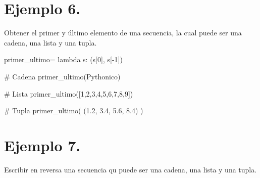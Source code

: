 \documentclass[
  letterpaper,
  DIV=11,
  numbers=noendperiod]{scrreprt}
\newenvironment{Shaded}{\begin{snugshade}}{\end{snugshade}}
\newcommand{\CommentTok}[1]{\textcolor[rgb]{0.37,0.37,0.37}{#1}}
\newcommand{\DecValTok}[1]{\textcolor[rgb]{0.68,0.00,0.00}{#1}}
\newcommand{\FloatTok}[1]{\textcolor[rgb]{0.68,0.00,0.00}{#1}}
\newcommand{\KeywordTok}[1]{\textcolor[rgb]{0.00,0.23,0.31}{#1}}
\newcommand{\NormalTok}[1]{\textcolor[rgb]{0.00,0.23,0.31}{#1}}
\newcommand{\OperatorTok}[1]{\textcolor[rgb]{0.37,0.37,0.37}{#1}}
\newcommand{\StringTok}[1]{\textcolor[rgb]{0.13,0.47,0.30}{#1}}
\begin{document}
\section{\texorpdfstring{\textbf{Ejemplo
6.}}{Ejemplo 6.}}\label{ejemplo-6.}

Obtener el primer y último elemento de una secuencia, la cual puede ser
una cadena, una lista y una tupla.

\begin{Shaded}
\begin{Highlighting}[]
\NormalTok{primer\_ultimo}\OperatorTok{=} \KeywordTok{lambda}\NormalTok{ s: (s[}\DecValTok{0}\NormalTok{], s[}\OperatorTok{{-}}\DecValTok{1}\NormalTok{])}
\end{Highlighting}
\end{Shaded}

\begin{Shaded}
\begin{Highlighting}[]
\CommentTok{\# Cadena}
\NormalTok{primer\_ultimo(}\StringTok{\textquotesingle{}Pythonico\textquotesingle{}}\NormalTok{)}
\end{Highlighting}
\end{Shaded}

\begin{Shaded}
\begin{Highlighting}[]
\CommentTok{\# Lista}
\NormalTok{primer\_ultimo([}\DecValTok{1}\NormalTok{,}\DecValTok{2}\NormalTok{,}\DecValTok{3}\NormalTok{,}\DecValTok{4}\NormalTok{,}\DecValTok{5}\NormalTok{,}\DecValTok{6}\NormalTok{,}\DecValTok{7}\NormalTok{,}\DecValTok{8}\NormalTok{,}\DecValTok{9}\NormalTok{])}
\end{Highlighting}
\end{Shaded}

\begin{Shaded}
\begin{Highlighting}[]
\CommentTok{\# Tupla}
\NormalTok{primer\_ultimo( (}\FloatTok{1.2}\NormalTok{, }\FloatTok{3.4}\NormalTok{, }\FloatTok{5.6}\NormalTok{, }\FloatTok{8.4}\NormalTok{) )}
\end{Highlighting}
\end{Shaded}

\section{\texorpdfstring{\textbf{Ejemplo
7.}}{Ejemplo 7.}}\label{ejemplo-7.}

Escribir en reversa una secuencia qu puede ser una cadena, una lista y
una tupla.
\end{document}
